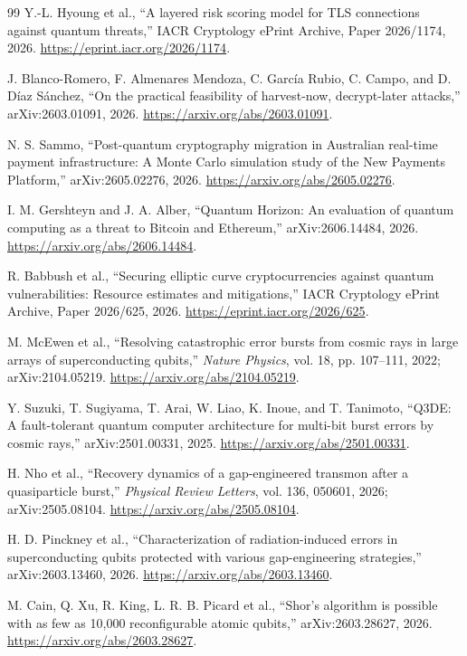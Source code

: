 \documentclass[10pt]{article}
\begin{document}
\begin{thebibliography}{99}
Y.-L. Hyoung et al., ``A layered risk scoring model for TLS connections against quantum threats,'' IACR Cryptology ePrint Archive, Paper 2026/1174, 2026. \url{https://eprint.iacr.org/2026/1174}.

J. Blanco-Romero, F. Almenares Mendoza, C. Garc\'ia Rubio, C. Campo, and D. D\'iaz S\'anchez, ``On the practical feasibility of harvest-now, decrypt-later attacks,'' arXiv:2603.01091, 2026. \url{https://arxiv.org/abs/2603.01091}.

N. S. Sammo, ``Post-quantum cryptography migration in Australian real-time payment infrastructure: A Monte Carlo simulation study of the New Payments Platform,'' arXiv:2605.02276, 2026. \url{https://arxiv.org/abs/2605.02276}.

I. M. Gershteyn and J. A. Alber, ``Quantum Horizon: An evaluation of quantum computing as a threat to Bitcoin and Ethereum,'' arXiv:2606.14484, 2026. \url{https://arxiv.org/abs/2606.14484}.

R. Babbush et al., ``Securing elliptic curve cryptocurrencies against quantum vulnerabilities: Resource estimates and mitigations,'' IACR Cryptology ePrint Archive, Paper 2026/625, 2026. \url{https://eprint.iacr.org/2026/625}.

M. McEwen et al., ``Resolving catastrophic error bursts from cosmic rays in large arrays of superconducting qubits,'' \emph{Nature Physics}, vol. 18, pp. 107--111, 2022; arXiv:2104.05219. \url{https://arxiv.org/abs/2104.05219}.

Y. Suzuki, T. Sugiyama, T. Arai, W. Liao, K. Inoue, and T. Tanimoto, ``Q3DE: A fault-tolerant quantum computer architecture for multi-bit burst errors by cosmic rays,'' arXiv:2501.00331, 2025. \url{https://arxiv.org/abs/2501.00331}.

H. Nho et al., ``Recovery dynamics of a gap-engineered transmon after a quasiparticle burst,'' \emph{Physical Review Letters}, vol. 136, 050601, 2026; arXiv:2505.08104. \url{https://arxiv.org/abs/2505.08104}.

H. D. Pinckney et al., ``Characterization of radiation-induced errors in superconducting qubits protected with various gap-engineering strategies,'' arXiv:2603.13460, 2026. \url{https://arxiv.org/abs/2603.13460}.

M. Cain, Q. Xu, R. King, L. R. B. Picard et al., ``Shor's algorithm is possible with as few as 10,000 reconfigurable atomic qubits,'' arXiv:2603.28627, 2026. \url{https://arxiv.org/abs/2603.28627}.


\end{thebibliography}
\end{document}
